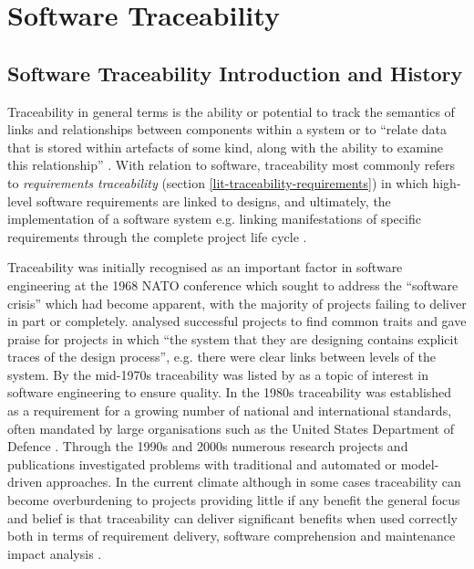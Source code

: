 \section{Software Traceability}\label{lit-traceability}

\subsection{Software Traceability Introduction and History}\label{lit-traceability-introduction}

Traceability in general terms is the ability or potential to track the semantics of links and relationships between components within a system \citep{asuncion2007end} or to ``relate data that is stored within artefacts of some kind, along with the ability to examine this relationship'' \citep{cleland2012software}. With relation to software, traceability most commonly refers to \textit{requirements traceability} (section \ref{lit-traceability-requirements}) in which high-level software requirements are linked to designs, and ultimately, the implementation of a software system e.g. linking manifestations of specific requirements through the complete project life cycle \citep{edwards1991methodology,asuncion2007end}.

Traceability was initially recognised as an important factor in software engineering at the 1968 NATO conference which sought to address the ``software crisis'' which had become apparent, with the majority of projects failing to deliver in part or completely. \cite{naur1969software} analysed successful projects to find common traits and gave praise for projects in which ``the system that they are designing contains explicit traces of the design process'', e.g. there were clear links between levels of the system. By the mid-1970s traceability was listed by \cite{boehm1976quantitative} as a topic of interest in software engineering to ensure quality. In the 1980s traceability was established as a requirement for a growing number of national and international standards, often mandated by large organisations such as the United States Department of Defence \citep{dorfman1990standards}. Through the 1990s and 2000s numerous research projects and publications investigated problems with traditional \citep{ramesh1993issues,gotel1994analysis} and automated \citep{laurent2007towards} or model-driven \citep{galvao2007survey} approaches. In the current climate although in some cases traceability can become overburdening to projects providing little if any benefit \citep{asuncion2007end} the general focus and belief is that traceability can deliver significant benefits when used correctly both in terms of requirement delivery, software comprehension and maintenance impact analysis \citep{cleland2012software,spanoudakis2005software}.

